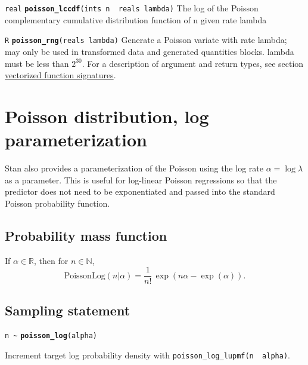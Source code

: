 \documentclass[
  10pt,
]{book}
\begin{document}
\texttt{real} \textbf{\texttt{poisson\_lccdf}}\texttt{(ints\ n\ \textbar{}\ reals\ lambda)}\newline
The log of the Poisson complementary cumulative distribution function
of n given rate lambda


\texttt{R} \textbf{\texttt{poisson\_rng}}\texttt{(reals\ lambda)}\newline
Generate a Poisson variate with rate lambda; may only be used in
transformed data and generated quantities blocks. lambda must be less than
\(2^{30}\). For a description of argument and return types, see section
\protect\hyperlink{prob-vectorization}{vectorized function signatures}.

\hypertarget{poisson-distribution-log-parameterization}{%
\section{Poisson distribution, log parameterization}\label{poisson-distribution-log-parameterization}}

Stan also provides a parameterization of the Poisson using the log
rate \(\alpha = \log \lambda\) as a parameter. This is useful for
log-linear Poisson regressions so that the predictor does not need to
be exponentiated and passed into the standard Poisson probability
function.

\hypertarget{probability-mass-function-14}{%
\subsection{Probability mass function}\label{probability-mass-function-14}}

If \(\alpha \in \mathbb{R}\), then for \(n \in \mathbb{N}\), \[
\text{PoissonLog}(n|\alpha) = \frac{1}{n!} \, \exp \left(n\alpha -
\exp(\alpha) \right). \]

\hypertarget{sampling-statement-18}{%
\subsection{Sampling statement}\label{sampling-statement-18}}

\texttt{n\ \textasciitilde{}} \textbf{\texttt{poisson\_log}}\texttt{(alpha)}

Increment target log probability density with \texttt{poisson\_log\_lupmf(n\ \textbar{}\ alpha)}.
\end{document}
